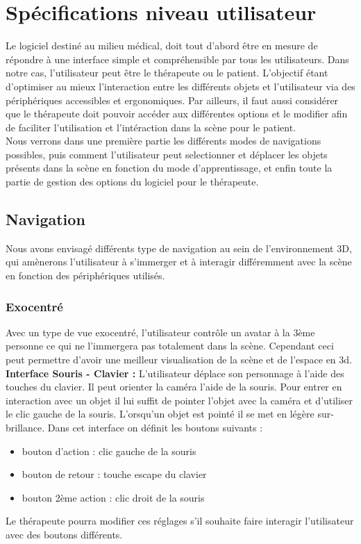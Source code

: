 \section{Spécifications niveau utilisateur}

Le logiciel destiné au milieu médical, doit tout d'abord être en mesure de répondre à une interface simple et compréhensible par tous les utilisateurs. Dans notre cas, l'utilisateur peut être le thérapeute ou le patient. L'objectif étant d'optimiser au mieux l'interaction entre les différents objets et l'utilisateur via des périphériques accessibles et ergonomiques. Par ailleurs, il faut aussi considérer que le thérapeute doit pouvoir accéder aux différentes options et le modifier afin de faciliter l'utilisation et l'intéraction dans la scène pour le patient.
\\
Nous verrons dans une première partie les différents modes de navigations possibles, puis comment l'utilisateur peut selectionner et déplacer les objets présents dans la scène en fonction du mode d'apprentissage, et enfin toute la partie de gestion des options du logiciel pour le thérapeute.

\subsection{Navigation}
Nous avons envisagé différents type de navigation au sein de l’environnement 3D, qui amènerons l’utilisateur à s’immerger et à interagir différemment avec la scène en fonction des périphériques utilisés.

\subsubsection{Exocentré }
Avec un type de vue exocentré, l’utilisateur contrôle un avatar à la 3ème personne ce qui ne l’immergera pas totalement dans la scène. Cependant ceci peut permettre d'avoir une meilleur visualisation de la scène et de l'espace en 3d.
\\
\textbf{Interface Souris - Clavier : }
L’utilisateur déplace son personnage à l’aide des touches du clavier. Il peut orienter la caméra l’aide de la souris. Pour entrer en interaction avec un objet il lui suffit de pointer l’objet avec la caméra et d’utiliser le clic gauche de la souris. L'orsqu'un objet est pointé il se met en légère sur-brillance. 
Dans cet interface on définit les boutons suivants :
	\begin{itemize}
  				\item bouton d’action : clic gauche de la souris
				 \item bouton de retour : touche escape du clavier
  				\item  bouton 2ème action : clic droit de la souris
			\end{itemize}
Le thérapeute pourra modifier ces réglages s'il souhaite faire interagir l'utilisateur avec des boutons différents.
\\


